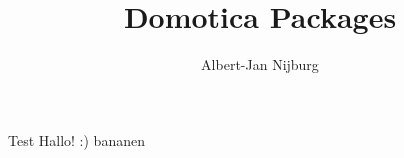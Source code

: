 \documentclass[a4paper]{report}
\author{Albert-Jan Nijburg}
\title{Domotica Packages}
\begin{document}
\maketitle
Test Hallo! :) bananen
\end{document}
